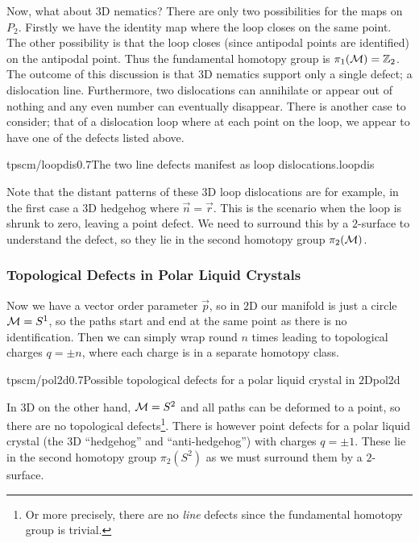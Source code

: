 \paraskip
Now, what about $3$D nematics? There are only two possibilities for the maps on $P_2$. Firstly we have the identity map where the loop closes on the same point. The other possibility is that the loop closes (since antipodal points are identified) on the antipodal point. Thus the fundamental homotopy group is $\pi_1(\mathcal{M}) = \mathbb{Z}_2$. The outcome of this discussion is that $3$D nematics support only a single defect; a dislocation line. Furthermore, two dislocations can annihilate or appear out of nothing and any even number can eventually disappear. There is another case to consider; that of a dislocation loop where at each point on the loop, we appear to have one of the defects listed above. 
\begin{mygraphic}{tpscm/loopdis}{0.7}{The two line defects manifest as loop dislocations.}{loopdis}\end{mygraphic}
Note that the distant patterns of these $3$D loop dislocations are for example, in the first case a $3$D hedgehog where $\vec{n} = \vec{r}$. This is the scenario when the loop is shrunk to zero, leaving a point defect. We need to surround this by a $2$-surface to understand the defect, so they lie in the second homotopy group $\pi_2(\mathcal{M})$.
\subsubsection{Topological Defects in Polar Liquid Crystals}
Now we have a vector order parameter $\vec{p}$, so in $2$D our manifold is just a circle $\mathcal{M} = S^1$, so the paths start and end at the same point as there is no identification. Then we can simply wrap round $n$ times leading to topological charges $q = \pm n$, where each charge is in a separate homotopy class.
\begin{mygraphic}{tpscm/pol2d}{0.7}{Possible topological defects for a polar liquid crystal in $2$D}{pol2d}\end{mygraphic}
In $3$D on the other hand, $\mathcal{M} = S^2$ and all paths can be deformed to a point, so there are no topological defects\footnote{Or more precisely, there are no \emph{line} defects since the fundamental homotopy group is trivial.}. There is however point defects for a polar liquid crystal (the $3$D ``hedgehog'' and ``anti-hedgehog'') with charges $q = \pm 1$. These lie in the second homotopy group $\pi_2(S^2)$ as we must surround them by a $2$-surface.
\newpage
